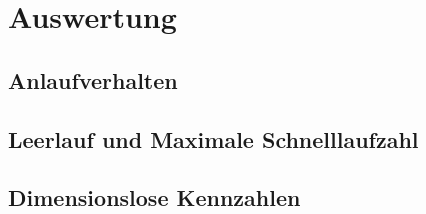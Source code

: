 \section{Auswertung}
\label{sec:Auswertung}
\subsection{Anlaufverhalten}
\subsection{Leerlauf und Maximale Schnelllaufzahl}
\subsection{Dimensionslose Kennzahlen}